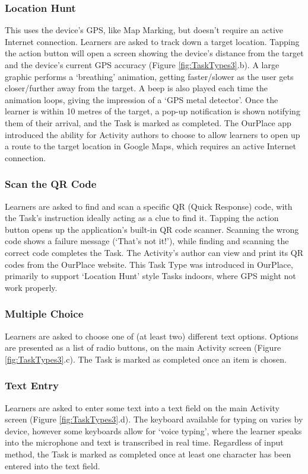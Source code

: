 \subsubsection*{Location Hunt}
This uses the device's GPS, like Map Marking, but doesn't require an active Internet connection. Learners are asked to track down a target location. Tapping the action button will open a screen showing the device's distance from the target and the device's current GPS accuracy (Figure \ref{fig:TaskTypes3}.b). A large graphic performs a `breathing' animation, getting faster/slower as the user gets closer/further away from the target. A beep is also played each time the animation loops, giving the impression of a `GPS metal detector'. Once the learner is within 10 metres of the target, a pop-up notification is shown notifying them of their arrival, and the Task is marked as completed. The OurPlace app introduced the ability for Activity authors to choose to allow learners to open up a route to the target location in Google Maps, which requires an active Internet connection.

\subsubsection*{Scan the QR Code}
Learners are asked to find and scan a specific QR (Quick Response) code, with the Task's instruction ideally acting as a clue to find it. Tapping the action button opens up the application's built-in QR code scanner. Scanning the wrong code shows a failure message (`That's not it!'), while finding and scanning the correct code completes the Task. The Activity's author can view and print its QR codes from the OurPlace website. This Task Type was introduced in OurPlace, primarily to support `Location Hunt' style Tasks indoors, where GPS might not work properly.

\subsubsection*{Multiple Choice}
Learners are asked to choose one of (at least two) different text options. Options are presented as a list of radio buttons, on the main Activity screen (Figure \ref{fig:TaskTypes3}.c). The Task is marked as completed once an item is chosen.

\subsubsection*{Text Entry}
Learners are asked to enter some text into a text field on the main Activity screen (Figure \ref{fig:TaskTypes3}.d). The keyboard available for typing on varies by device, however some keyboards allow for `voice typing', where the learner speaks into the microphone and text is transcribed in real time. Regardless of input method, the Task is marked as completed once at least one character has been entered into the text field. 

